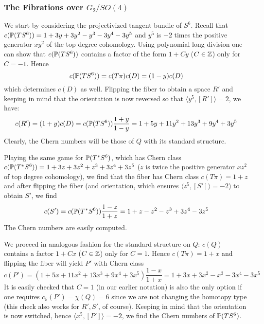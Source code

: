 \documentclass{scrartcl}
\begin{document}
\subsubsection{The Fibrations over $G_2/SO(4)$}

We start by considering the projectivized tangent bundle of $S^6$. Recall that $c(\P(TS^6))=1+3y+3y^2-y^3-3y^4-3y^5$ and $y^5$ is $-2$ times the positive generator $xy^2$ of the top degree cohomology. Using polynomial long division one can show that $c(\P(TS^6))$ contains a factor of the form $1+Cy$ ($C\in\Z$) only for $C=-1$. Hence
\begin{equation*}
	c(\P(TS^6))=c(T\pi)c(D)=(1-y)c(D)
\end{equation*}
which determines $c(D)$ as well. Flipping the fiber to obtain a space $R'$ and keeping in mind that the orientation is now reversed so that $\langle y^5,[R']\rangle=2$, we have:
\begin{equation*}
	c(R')=(1+y)c(D)=c(\P(TS^6))\frac{1+y}{1-y}=1+5y+11y^2+13y^3+9y^4+3y^5
\end{equation*}
Clearly, the Chern numbers will be those of $Q$ with its standard structure. 

\medskip

Playing the same game for $\P(T^*S^6)$, which has Chern class $c(\P(T^*S^6))=1+3z+3z^2+z^3+3z^4+3z^5$ ($z$ is twice the positive generator $xz^2$ of top degree cohomology), we find that the fiber has Chern class $c(T\pi)=1+z$ and after flipping the fiber (and orientation, which ensures $\langle z^5,[S']\rangle=-2$) to obtain $S'$, we find
\begin{equation*}
	c(S')=c(\P(T^*S^6))\frac{1-z}{1+z}=1+z-z^2-z^3+3z^4-3z^5
\end{equation*}
The Chern numbers are easily computed.

\medskip

We proceed in analogous fashion for the standard structure on $Q$: $c(Q)$ contains a factor $1+Cx$ ($C\in\Z$) only for $C=1$. Hence $c(T\pi)=1+x$ and flipping the fiber will yield $P'$ with Chern class
\begin{equation*}
	c(P')=(1+5x+11x^2+13x^3+9x^4+3x^5)\frac{1-x}{1+x}
	=1+3x+3x^2-x^3-3x^4-3x^5
\end{equation*}
It is easily checked that $C=1$ (in our earlier notation) is also the only option if one requires $c_5(P')=\chi(Q)=6$ since we are not changing the homotopy type (this check also works for $R',S'$, of course). Keeping in mind that the orientation is now switched, hence $\langle x^5,[P']\rangle=-2$, we find the Chern numbers of $\P(TS^6)$. 
\end{document}
